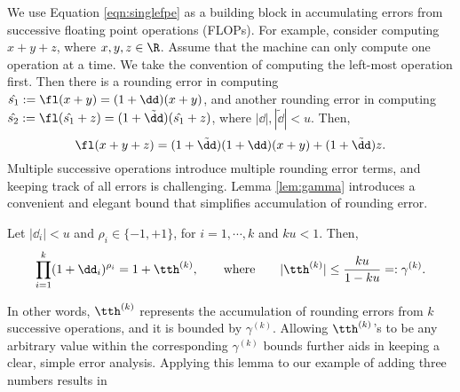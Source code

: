 We use Equation \ref{eqn:singlefpe} as a building block in accumulating errors from successive floating point operations (FLOPs).
For example, consider computing $x+y+z$, where $x,y,z\in\R$.
Assume that the machine can only compute one operation at a time.
We take the convention of computing the left-most operation first.
Then there is a rounding error in computing $\hat{s_1}:= \fl(x+y) = (1+\dd)(x+y)$, and another rounding error in computing $\hat{s_2}:= \fl(\hat{s_1}+ z) = (1+\tilde{\dd})(\hat{s_1}+z)$, where $|\dd|,|\tilde{\dd}|<u$.
Then, 
\begin{equation}
\fl(x+y+z) = (1+\tilde{\dd})(1+\dd) (x+y) + (1+\tilde{\dd}) z.\label{eqn:FPbasic3}
\end{equation}
Multiple successive operations introduce multiple rounding error terms, and keeping track of all errors is challenging.
Lemma \ref{lem:gamma} introduces a convenient and elegant bound that simplifies accumulation of rounding error. 
\begin{lemma}
	\label{lem:gamma}
	Let $|\dd_i|<u$ and $\rho_i \in\{-1, +1\}$, for $i = 1 , \cdots, k$ and $ku < 1$. Then, 
	\begin{equation}
	\prod_{i=1}^k (1+\dd_i)^{\rho_i} = 1 + \tth^{(k)},
	\qquad \mbox{where} \qquad
	|\tth^{(k)}|\leq \frac{ku}{1-ku}=:\gamma^{(k)}.
	\end{equation}
\end{lemma}
In other words, $\tth^{(k)}$ represents the accumulation of rounding errors from $k$ successive operations, and it is bounded by $\gamma^{(k)}$. 
Allowing $\tth^{(k)}$'s to be any arbitrary value within the corresponding $\gamma^{(k)}$ bounds further aids in keeping a clear, simple error analysis. 
Applying this lemma to our example of adding three numbers results in
